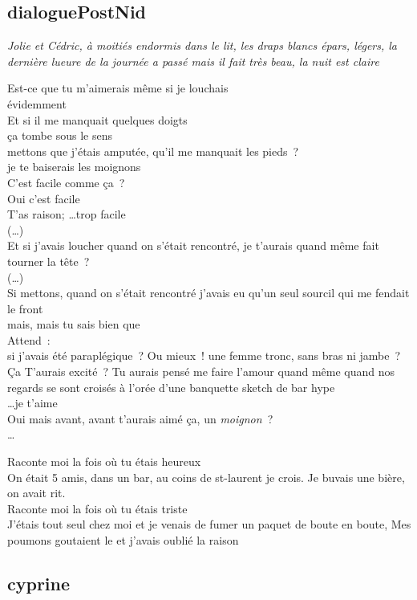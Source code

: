 \documentclass{article}
\begin{document}
\subsection{dialoguePostNid}
 \textit{Jolie et Cédric, à moitiés endormis dans le lit, les
draps blancs épars, légers, la dernière lueure de la journée a passé
mais il fait très beau, la nuit est claire}

Est-ce que tu m’aimerais même si je louchais\\
évidemment\\
Et si il me manquait quelques doigts\\
ça tombe sous le sens\\
mettons que j’étais amputée, qu’il me manquait les pieds ?\\
je te baiserais les moignons\\
C’est facile comme ça ?\\
Oui c’est facile\\
T’as raison; \ldots trop facile\\
(…)\\
Et si j’avais loucher quand on s’était rencontré, je t’aurais quand même fait tourner la tête ?\\
(…)\\
Si mettons, quand on s’était rencontré j'avais eu qu’un seul sourcil qui me
fendait le front\\
mais, mais tu sais bien que\\
Attend :\\
si j’avais été paraplégique ? Ou mieux ! une femme tronc, sans bras ni
jambe ? Ça T’aurais excité ? Tu aurais pensé me faire l’amour quand même quand
nos regards se sont croisés à l’orée d’une banquette sketch de bar hype\\

\ldots je t’aime\\
Oui mais avant, avant t’aurais aimé ça, un \textit{moignon} ? \\

\ldots

Raconte moi la fois où tu étais heureux\\
On était 5 amis, dans un bar, au coins de st-laurent je crois.
Je buvais une bière, on avait rit.\\
Raconte moi la fois où tu étais triste\\
J'étais tout seul chez moi et je venais de fumer
un paquet de boute en boute, Mes poumons goutaient le
et j'avais oublié la raison
\clearpage

\subsection{cyprine}
\end{document}

